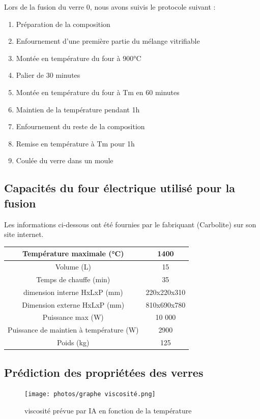 \documentclass{article}
\begin{document}
Lors de la fusion du verre 0, nous avons suivis le protocole suivant :

\begin{enumerate}
    \item Préparation de la composition
    \item Enfournement d'une première partie du mélange vitrifiable
    \item Montée en température du four à 900°C
    \item Palier de 30 minutes
    \item Montée en température du four à Tm en 60 minutes
    \item Maintien de la température pendant 1h
    \item Enfournement du reste de la composition
    \item Remise en température à Tm pour 1h
    \item Coulée du verre dans un moule
\end{enumerate}

\subsection{Capacités du four électrique utilisé pour la fusion}

Les informations ci-dessous ont été fournies par le fabriquant (Carbolite) sur son site internet.

\begin{table}[h!]
    \centering
\begin{tabular}{|c|c|}
\hline
Température maximale (°C) & 1400  \\
\hline
Volume (L) & 15 \\
\hline
Temps de chauffe (min) & 35 \\
\hline
dimension interne HxLxP (mm) & 220x220x310 \\
\hline
Dimension externe HxLxP (mm) & 810x690x780 \\
\hline
Puissance max (W) & 10 000 \\
\hline
Puissance de maintien à température (W) & 2900 \\
\hline
Poids (kg) & 125 \\
\hline
\end{tabular} 
\end{table}

\subsection{Prédiction des propriétées des verres}
\begin{figure}[ht]
    \centering
    \texttt{[image: photos/graphe viscosité.png]}
    \caption{viscosité prévue par IA en fonction de la température}
\end{figure}
\end{document}
